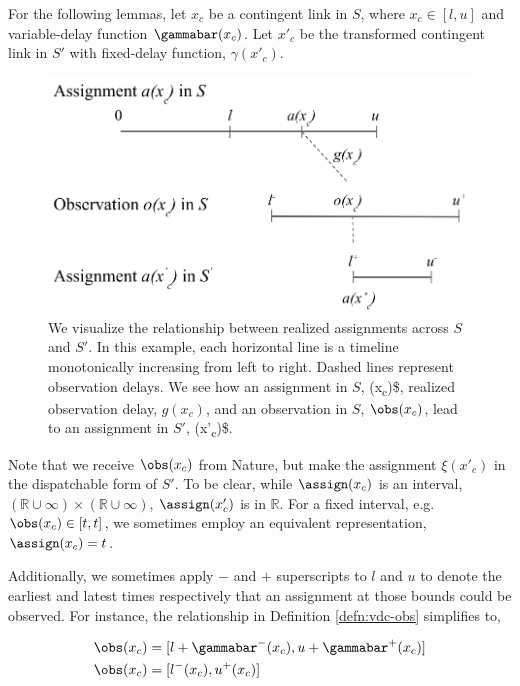 \documentclass[11pt]{article}
\begin{document}
For the following lemmas, let \(x_{c}\) be a contingent link in \(S\), where \(x_{c} \in [l, u]\) and
variable-delay function \(\gammabar(x_{c})\). Let \(x'_{c}\) be the transformed contingent link in \(S'\)
with fixed-delay function, \(\gamma(x'_{c})\).

\begin{figure}[htbp]
\centering
\includegraphics[width=.9\linewidth]{viz-eqn-obs-assign.png}
\caption{\label{fig:obs-assign}We visualize the relationship between realized assignments across \(S\) and \(S'\). In this example, each horizontal line is a timeline monotonically increasing from left to right. Dashed lines represent observation delays. We see how an assignment in \(S\), \assign(x\textsubscript{c})\$, realized observation delay, \(g(x_{c})\), and an observation in \(S\), \(\obs(x_{c})\), lead to an assignment in \(S'\), \assign(x'\textsubscript{c})\$.}
\end{figure}

Note that we receive \(\obs(x_{c})\) from Nature, but make the assignment \(\xi(x'_{c})\) in the
dispatchable form of \(S'\). To be clear, while \(\assign(x_{c})\) is an interval, \((\mathbb{R} \cup
\infty) \times (\mathbb{R} \cup \infty)\), \(\assign(x'_{c})\) is in \(\mathbb{R}\). For a fixed
interval, e.g. \(\obs(x_{c}) \in [t, t]\), we sometimes employ an equivalent representation,
\(\assign(x_{c}) = t\).


Additionally, we sometimes apply \(-\) and \(+\) superscripts to \(l\) and \(u\) to denote the earliest and
latest times respectively that an assignment at those bounds could be observed. For instance, the
relationship in Definition \ref{defn:vdc-obs} simplifies to,

\begin{align}
\label{eqn:obs-assign}
\label{eqn:obs-assign}
\obs(x_{c}) &= [l + \gammabar^-(x_{c}), u + \gammabar^+(x_{c})] \\
\obs(x_{c}) &= [l^-(x_{c}), u^+(x_{c})]
\end{align}
\end{document}
